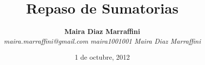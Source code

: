 \title{\textbf{Repaso de Sumatorias \Sigma}}
\author{\textbf{Maira Diaz Marraffini} 
\\
\emph{maira.marraffini@gmail.com} 
\emph{\faGithub maira1001001} 
\emph{\faLinkedinSquare Maira Diaz Marraffini} }
\date{1 de octubre, 2012}
